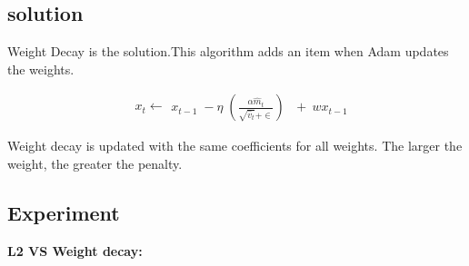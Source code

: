 \documentclass{article}
\begin{document}
\subsection{solution}

Weight Decay is the solution.This algorithm adds an item when Adam updates the weights.

\begin{equation}
\begin{array}{l}\begin{array}{l}x_t\leftarrow\end{array}x_{t-1}\;-\eta\;\left(\frac{\alpha{\widehat m}_t}{\sqrt{{\widehat v}_t}+\in}\right)\end{array}\;+\:wx_{t-1}
\end{equation}

Weight decay is updated with the same coefficients for all weights. The larger the weight, the greater the penalty.


\subsection{Experiment}


\textbf{L2 VS Weight decay:}


\begin{figure}[H]\label{q4:adam}
	\centering  %
	\label{Fig.main}
\end{figure}
\end{document}
